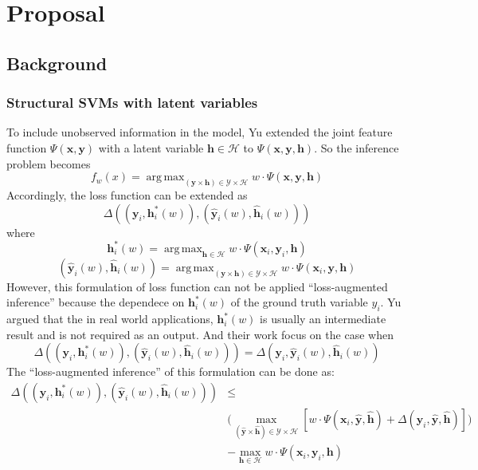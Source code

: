\documentclass{article}
\DeclareMathOperator*{\argmax}{arg\,max}
\begin{document}
	
	
	\section{Proposal}
	
	\subsection{Background}
		\subsubsection{Structural SVMs with latent variables}
		To include unobserved information in the model, Yu\cite{yu2009learning} extended the joint feature function  $\Psi(\mathbf{x},\mathbf{y}) $ with a latent variable $\mathbf{h}\in \mathcal{H}$ to $\Psi(\mathbf{x},\mathbf{y},\mathbf{h}) $. So the inference problem becomes
		$$
		f_w(x) = \argmax_{(\mathbf{y} \times \mathbf{h}) \in \mathcal{Y} \times \mathcal{H}} w\cdot\Psi(\mathbf{x},\mathbf{y},\mathbf{h})
		$$
		Accordingly, the loss function can be extended as
		$$
		\Delta((\mathbf{y}_i,\mathbf{h}^*_i(w)),(\mathbf{\hat{y}}_i(w),\mathbf{\hat{h}}_i(w)))
		$$
		where
		$$
		\mathbf{h}^*_i(w) = \argmax_{\mathbf{h} \in \mathcal{H}} w \cdot \Psi(\mathbf{x}_i,\mathbf{y}_i,\mathbf{h})
		$$
		$$
		(\mathbf{\hat{y}}_i(w),\mathbf{\hat{h}}_i(w))=\argmax_{(\mathbf{y} \times \mathbf{h}) \in \mathcal{Y} \times \mathcal{H}} w\cdot\Psi(\mathbf{x}_i,\mathbf{y},\mathbf{h})
		$$
		However, this formulation of loss function can not be applied ``loss-augmented inference'' because the dependece on $\mathbf{h}^*_i(w)$ of the ground truth variable $y_i$.  Yu\cite{yu2009learning} argued that the in real world applications, $\mathbf{h}^*_i(w)$ is usually an intermediate result and is not required as an output. And their work focus on the case when
		$$
		\Delta((\mathbf{y}_i,\mathbf{h}^*_i(w)),(\mathbf{\hat{y}}_i(w),\mathbf{\hat{h}}_i(w)))=\Delta(\mathbf{y}_i,\mathbf{\hat{y}}_i(w),\mathbf{\hat{h}}_i(w))
		$$
		The ``loss-augmented inference'' of this formulation can be done as:
		\begin{align*}
			\Delta((\mathbf{y}_i,\mathbf{h}^*_i(w)),(\mathbf{\hat{y}}_i(w),\mathbf{\hat{h}}_i(w)))
			&\leq\\
			&\bigg(\max_{(\mathbf{\hat{y}} \times \mathbf{\hat{h}}) \in \mathcal{Y} \times \mathcal{H}} [w\cdot\Psi(\mathbf{x}_i,\mathbf{\hat{y}},\mathbf{\hat{h}}) + \Delta(\mathbf{y}_i,\mathbf{\hat{y}},\mathbf{\hat{h}})]\bigg)\\
			&-\max_{\mathbf{h} \in \mathcal{H}} w \cdot \Psi(\mathbf{x}_i,\mathbf{y}_i,\mathbf{h})
		\end{align*}
\end{document}
